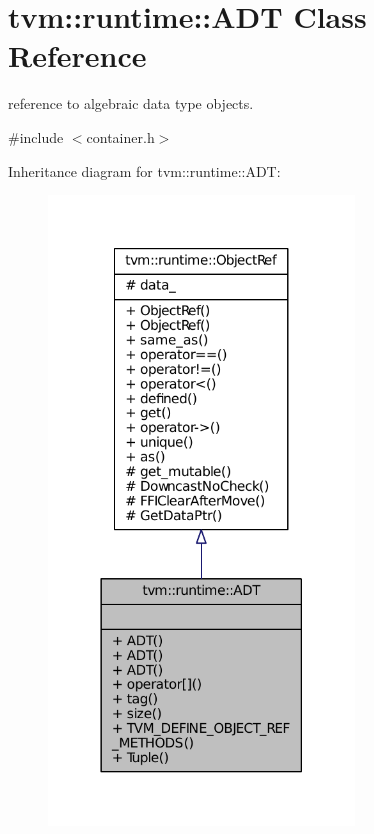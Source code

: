 \hypertarget{classtvm_1_1runtime_1_1ADT}{}\section{tvm\+:\+:runtime\+:\+:A\+DT Class Reference}
\label{classtvm_1_1runtime_1_1ADT}


reference to algebraic data type objects.  




{\ttfamily \#include $<$container.\+h$>$}



Inheritance diagram for tvm\+:\+:runtime\+:\+:A\+DT\+:
\nopagebreak
\begin{figure}[H]
\begin{center}
\leavevmode
\includegraphics[width=230pt]{classtvm_1_1runtime_1_1ADT__inherit__graph}
\end{center}
\end{figure}


